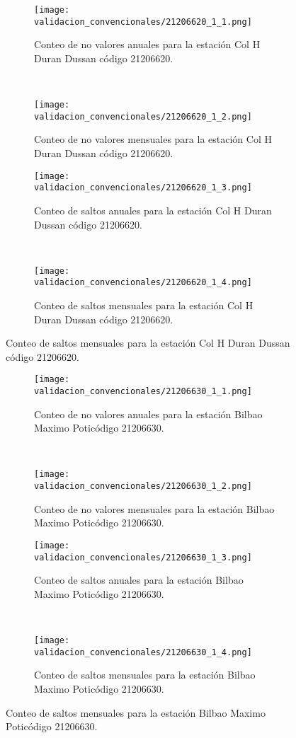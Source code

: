 \begin{figure}[H]\ContinuedFloat
\centering
	\begin{subfigure}[normla]{0.4\textwidth}
	\texttt{[image: validacion\_convencionales/21206620\_1\_1.png]}
		\caption{Conteo de no valores anuales para la estación Col H Duran Dussan código 21206620.}
		\label{subfig:a1}
		\end{subfigure}
		~
    \begin{subfigure}[normla]{0.4\textwidth}
	\texttt{[image: validacion\_convencionales/21206620\_1\_2.png]}
		\caption{Conteo de no valores mensuales para la estación Col H Duran Dussan código 21206620.}
		\label{subfig:a2}
		\end{subfigure}
		
    \begin{subfigure}[normla]{0.4\textwidth}
	\texttt{[image: validacion\_convencionales/21206620\_1\_3.png]}
		\caption{Conteo de saltos anuales para la estación Col H Duran Dussan código 21206620.}
		\label{subfig:a1}
		\end{subfigure}
		~
    \begin{subfigure}[normla]{0.4\textwidth}
	\texttt{[image: validacion\_convencionales/21206620\_1\_4.png]}
		\caption{Conteo de saltos mensuales para la estación Col H Duran Dussan código 21206620.}
		\label{subfig:a2}
		\end{subfigure}

	
\end{figure}
           
\begin{figure}[H]\ContinuedFloat
\centering
	\begin{subfigure}[normla]{0.4\textwidth}
	\texttt{[image: validacion\_convencionales/21206630\_1\_1.png]}
		\caption{Conteo de no valores anuales para la estación Bilbao Maximo Poticódigo 21206630.}
		\label{subfig:a1}
		\end{subfigure}
		~
    \begin{subfigure}[normla]{0.4\textwidth}
	\texttt{[image: validacion\_convencionales/21206630\_1\_2.png]}
		\caption{Conteo de no valores mensuales para la estación Bilbao Maximo Poticódigo 21206630.}
		\label{subfig:a2}
		\end{subfigure}
		
    \begin{subfigure}[normla]{0.4\textwidth}
	\texttt{[image: validacion\_convencionales/21206630\_1\_3.png]}
		\caption{Conteo de saltos anuales para la estación Bilbao Maximo Poticódigo 21206630.}
		\label{subfig:a1}
		\end{subfigure}
		~
    \begin{subfigure}[normla]{0.4\textwidth}
	\texttt{[image: validacion\_convencionales/21206630\_1\_4.png]}
		\caption{Conteo de saltos mensuales para la estación Bilbao Maximo Poticódigo 21206630.}
		\label{subfig:a2}
		\end{subfigure}

	
\end{figure}
           
